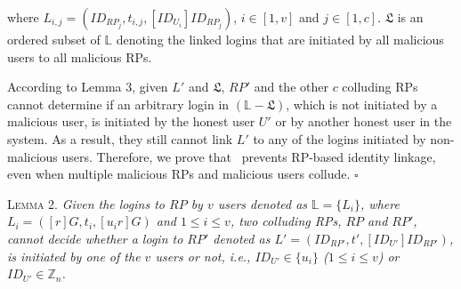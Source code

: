 \noindent where $L_{i,j} = (ID_{RP_j}, t_{i,j}, [ID_{U_i}]ID_{RP_j})$, $i \in [1, v]$ and $j \in [1, c]$. $\mathfrak{L}$ is an ordered subset of $\mathbb{L}$ denoting the linked logins that are initiated by all malicious users to all malicious RPs.

According to Lemma 3, given $L'$ and $\mathfrak{L}$, $RP'$ and the other $c$ colluding RPs cannot determine if an arbitrary login in $(\mathbb{L}-\mathfrak{L})$, which is not initiated by a malicious user, is initiated by the honest user $U'$ or by another honest user in the system. As a result, they still cannot link $L'$ to any of the logins initiated by non-malicious users. Therefore, we prove that \usso~prevents RP-based identity linkage, even when multiple malicious RPs and malicious users collude. \hfill $\square$


\vspace{3mm}
\noindent\textsc{Lemma 2.} {\em Given the logins to $RP$ by $v$ users denoted as $\mathbb{L} = \{{L_i}\}$, where $L_i = ([r]G, t_i, [u_i r]G)$ and $1 \leq i \leq v$, two colluding RPs, $RP$ and $RP'$, cannot decide whether a login to $RP'$ denoted as $L' = (ID_{RP'}, t', [ID_{U'}]ID_{RP'})$, is initiated by one of the $v$ users or not, i.e., $ID_{U'} \in \{u_i\}$ ($1 \leq i \leq v$) or $ID_{U'} \in \mathbb{Z}_n$.}



